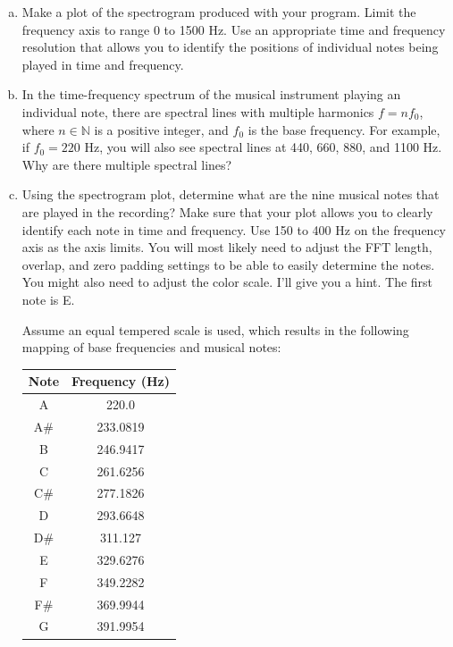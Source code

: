 \begin{enumerate}
\begin{enumerate}[a)]
          \item Make a plot of the spectrogram produced with your program. Limit
                the frequency axis to range 0 to 1500 Hz. Use an appropriate time
                and frequency resolution that allows you to identify the positions
                of individual notes being played in time and frequency.

          \item In the time-frequency spectrum of the musical instrument playing
                an individual note, there are spectral lines with multiple harmonics
                $f = n f_0$, where $n \in \mathbb{N}$ is a positive integer, and
                $f_0$ is the base frequency. For example, if $f_0= 220$ Hz, you will
                also see spectral lines at 440, 660, 880, and 1100 Hz. Why are there
                multiple spectral lines?

          \item Using the spectrogram plot, determine what are the nine musical
                notes that are played in the recording? Make sure that your plot
                allows you to clearly identify each note in time and frequency. Use
                150 to 400 Hz on the frequency axis as the axis limits. You will
                most likely need to adjust the FFT length, overlap, and zero padding
                settings to be able to easily determine the notes. You might also
                need to adjust the color scale. I'll give you a hint. The first note
                is E.

                Assume an equal tempered scale is used, which results in the following 
                mapping of base frequencies and musical notes:
                \begin{center}
                  \begin{tabular}{c|c}
                    Note & Frequency (Hz) \\
                    \hline
                    A    & 220.0          \\
                    A\#  & 233.0819       \\
                    B    & 246.9417       \\
                    C    & 261.6256       \\
                    C\#  & 277.1826       \\
                    D    & 293.6648       \\
                    D\#  & 311.127        \\
                    E    & 329.6276       \\
                    F    & 349.2282       \\
                    F\#  & 369.9944       \\
                    G    & 391.9954
                  \end{tabular}
                \end{center}
        \end{enumerate}
\end{enumerate}